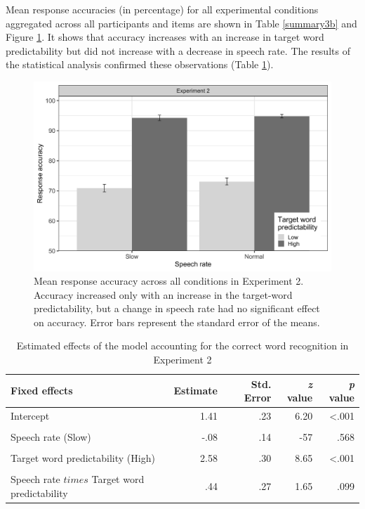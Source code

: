 \documentclass[a4paper, nobind]{templates/ociamthesis}
\begin{document}
Mean response accuracies (in percentage) for all experimental conditions aggregated across all participants and items are shown in Table \ref{summary3b} and Figure \ref{fig:figure3b}.
It shows that accuracy increases with an increase in target word predictability
but did not increase with a decrease in speech rate.
The results of the statistical analysis confirmed these observations (Table \ref{results3b}).

\begin{figure}

{\centering \includegraphics[width=0.95\linewidth]{figures/results-fig/expt-3b} 

}

\caption{Mean response accuracy across all conditions in Experiment 2. Accuracy increased only with an increase in the target-word predictability, but a change in speech rate had no significant effect on accuracy. Error bars represent the standard error of the means.}\label{fig:figure3b}
\end{figure}

\begin{table}[ht]
\begin{center}
\caption{Estimated effects of the model accounting for the correct word recognition in Experiment 2}
\label{results3b} 
\vskip 0.12in
\begin{tabular}[]{@{}lrrrr@{}}
\toprule
Fixed effects & Estimate & Std. Error & \emph{z} value & \emph{p}
value \\
\midrule
Intercept & 1.41 & .23 & 6.20 & \textless.001 \\
\\
Speech rate (Slow) & -.08 & .14 & -57 & .568 \\
\\
Target word predictability (High) & 2.58 & .30 & 8.65 & \textless.001 \\
\\
Speech rate $times$ Target word predictability & .44 & .27 & 1.65 & .099 \\
\bottomrule
\end{tabular} 
\end{center} 
\end{table}
\end{document}
